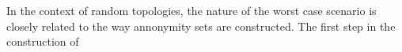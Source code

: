 \documentclass[12pt]{report}
\begin{document}
In the context of random topologies, the nature of the worst case scenario is closely related to the way annonymity sets are constructed. The first step in the construction of 
\end{document}
